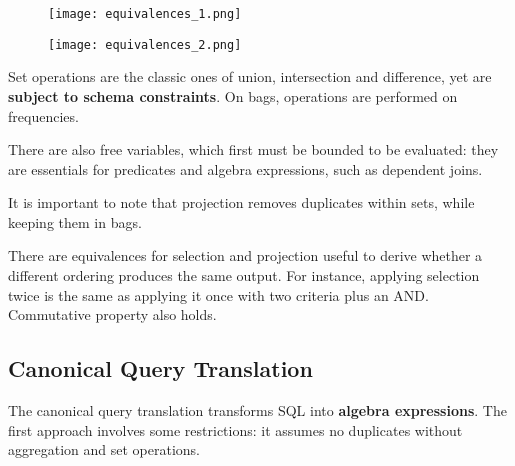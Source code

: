 \begin{figure}
	\begin{minipage}{0.45\textwidth}
		\hspace{-2mm}
		\texttt{[image: equivalences\_1.png]}
	\end{minipage}
	\begin{minipage}{0.5\textwidth}
		\hspace{-10mm}
		\texttt{[image: equivalences\_2.png]}
	\end{minipage}
	\vspace{-15pt}
\end{figure}

Set operations are the classic ones of union, intersection and difference, yet are \textbf{subject to schema constraints}. On bags, operations are performed on frequencies. 

There are also free variables, which first must be bounded to be evaluated: they are essentials for predicates and algebra expressions, such as dependent joins. 

It is important to note that projection removes duplicates within sets, while keeping them in bags.

There are equivalences for selection and projection useful to derive whether a different ordering produces the same output. For instance, applying selection twice is the same as applying it once with two criteria plus an AND. Commutative property also holds.

\subsection{Canonical Query Translation}
The canonical query translation transforms SQL into \textbf{algebra expressions}. The first approach involves some restrictions: it assumes no duplicates without aggregation and set operations.

